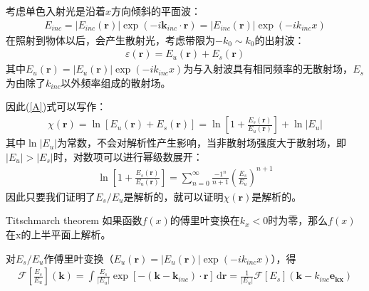 \documentclass[12pt,aspectratio=169]{beamer} %
\renewcommand{\vec}[1]{\boldsymbol{#1}} %
\begin{document}
\begin{frame}
    考虑单色入射光是沿着$x$方向倾斜的平面波：
    \begin{align}
        E_{inc}=\left| E_{inc}(\vec{r}) \right| \exp(-i\vec{k}_{inc}\cdot \vec{r})=\left| E_{inc}(\vec{r}) \right| \exp(-i k_{inc} x)
    \end{align}
    在照射到物体以后，会产生散射光，考虑带限为$-k_0\sim k_0$的出射波：
    \begin{align}
        \varepsilon(\vec{r})=E_u(\vec{r})+E_s(\vec{r})
    \end{align}
    其中$E_u(\vec{r})=\left| E_{u}(\vec{r}) \right| \exp(-i k_{inc} x)$为与入射波具有相同频率的无散射场，$E_s$为由除了$k_{inc}$以外频率组成的散射场。
\end{frame}

\begin{frame}
    因此(\ref{A})式可以写作：
    \begin{align}
        \chi (\vec{r})=\ln \left[E_u(\vec{r})+E_s(\vec{r})\right]=\ln [1+\frac{E_s(\vec{r})}{E_u(\vec{r})}]+\ln \left| E_u \right|
    \end{align}
    其中$\ln \left| E_u \right|$为常数，不会对解析性产生影响，当非散射场强度大于散射场，即$|E_u|>|E_s|$时，对数项可以进行幂级数展开：
    \begin{align}
        \ln [1+\frac{E_s(\vec{r})}{E_u(\vec{r})}]=\sum_{n=0}^{\infty}\frac{-1^n}{n+1}\left(\frac{E_s}{E_u}\right)^{n+1} \label{B}
    \end{align}
    因此只要我们证明了$E_s/E_u$是解析的，就可以证明$\chi(\vec{r})$是解析的。
\end{frame}

\begin{frame}
    \begin{block}{Titschmarch theorem}
        如果函数$f(x)$的傅里叶变换在$k_x<0$时为零，那么$f(x)$在x的上半平面上解析。
    \end{block}

    对$E_s/E_u$作傅里叶变换（$E_u(\vec{r})=\left| E_{u}(\vec{r}) \right| \exp(-i k_{inc} x)$），得
    \begin{align}
        \mathcal{F} [\frac{E_s}{E_u}](\vec{k})=\int \frac{E_s}{|E_u|} \exp[-(\vec{k}-\vec{k}_{inc}) \cdot \vec{r}] \, \mathrm{d}\vec{r}=\frac{1}{|E_u|} \mathcal{F} [E_s](\vec{k}-k_{inc}\vec{e_{kx}})
    \end{align} 
\end{frame}
\end{document}
